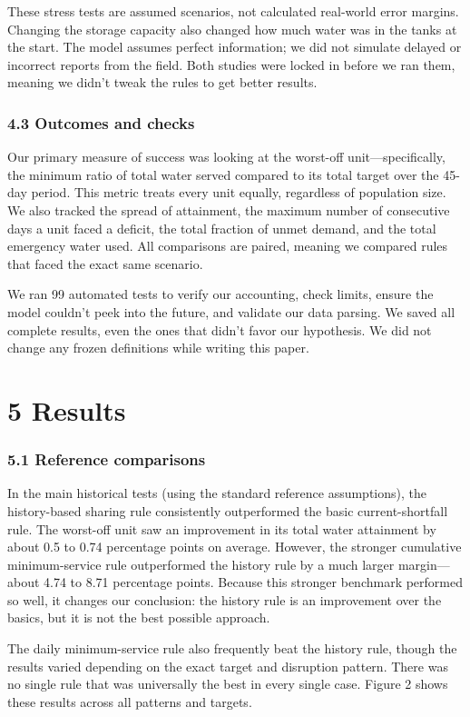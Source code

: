 \documentclass[conference]{IEEEtran}
\begin{document}
These stress tests are assumed scenarios, not calculated real-world error margins. Changing the storage capacity also changed how much water was in the tanks at the start. The model assumes perfect information; we did not simulate delayed or incorrect reports from the field. Both studies were locked in before we ran them, meaning we didn't tweak the rules to get better results.

\subsubsection{4.3 Outcomes and checks}
Our primary measure of success was looking at the worst-off unit—specifically, the minimum ratio of total water served compared to its total target over the 45-day period. This metric treats every unit equally, regardless of population size. We also tracked the spread of attainment, the maximum number of consecutive days a unit faced a deficit, the total fraction of unmet demand, and the total emergency water used. All comparisons are paired, meaning we compared rules that faced the exact same scenario.

We ran 99 automated tests to verify our accounting, check limits, ensure the model couldn't peek into the future, and validate our data parsing. We saved all complete results, even the ones that didn't favor our hypothesis. We did not change any frozen definitions while writing this paper.

\section{5 Results}
\subsubsection{5.1 Reference comparisons}
In the main historical tests (using the standard reference assumptions), the history-based sharing rule consistently outperformed the basic current-shortfall rule. The worst-off unit saw an improvement in its total water attainment by about 0.5 to 0.74 percentage points on average. However, the stronger cumulative minimum-service rule outperformed the history rule by a much larger margin—about 4.74 to 8.71 percentage points. Because this stronger benchmark performed so well, it changes our conclusion: the history rule is an improvement over the basics, but it is not the best possible approach.

The daily minimum-service rule also frequently beat the history rule, though the results varied depending on the exact target and disruption pattern. There was no single rule that was universally the best in every single case. Figure 2 shows these results across all patterns and targets.
\end{document}
